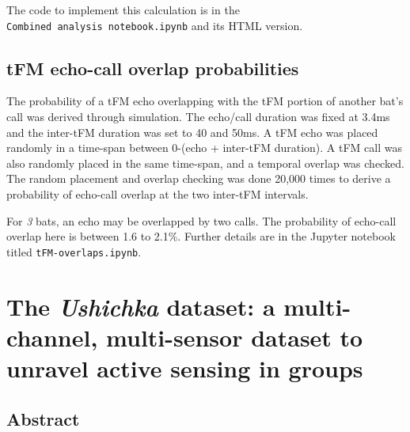 \documentclass[
]{book}
\begin{document}
The code to implement this calculation is in the \texttt{Combined\ analysis\ notebook.ipynb} and its HTML version.

\hypertarget{simtfmoverlap}{%
\section{tFM echo-call overlap probabilities}\label{simtfmoverlap}}

The probability of a tFM echo overlapping with the tFM portion of another bat's call was derived through simulation. The echo/call duration was fixed at 3.4ms and the inter-tFM duration was set to 40 and 50ms. A tFM echo was placed randomly in a time-span between 0-(echo + inter-tFM duration). A tFM call was also randomly placed in the same time-span, and a temporal overlap was checked. The random placement and overlap checking was done 20,000 times to derive a probability of echo-call overlap at the two inter-tFM intervals.

For \emph{3} bats, an echo may be overlapped by two calls. The probability of echo-call overlap here is between 1.6 to 2.1\%. Further details are in the Jupyter notebook titled \texttt{tFM-overlaps.ipynb}.

\hypertarget{ushichkachapter}{%
\chapter{\texorpdfstring{The \emph{Ushichka} dataset: a multi-channel, multi-sensor dataset to unravel active sensing in groups}{The Ushichka dataset: a multi-channel, multi-sensor dataset to unravel active sensing in groups}}\label{ushichkachapter}}


\newpage

\hypertarget{ushichka_abstract}{%
\section*{Abstract}\label{ushichka_abstract}}
\end{document}
